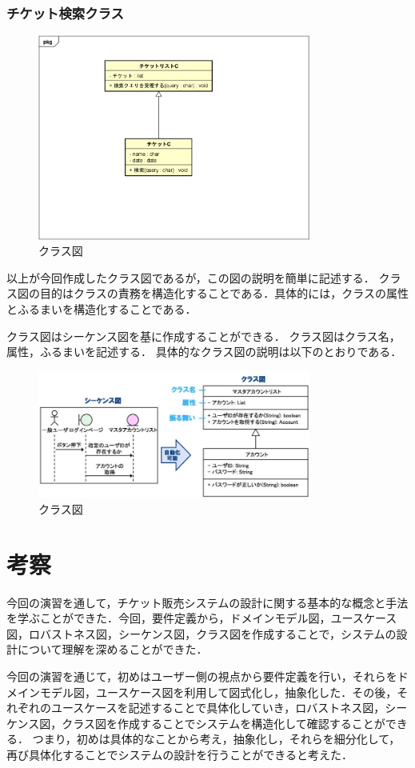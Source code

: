 \documentclass{ltjsarticle}
\begin{document}
\subsubsection{チケット検索クラス}
\begin{figure}[H]
    \centering
    \includegraphics[width=0.8\textwidth]{src/Class2.png}
    \caption{クラス図}
    \label{fig:class2}
\end{figure}

以上が今回作成したクラス図であるが，この図の説明を簡単に記述する．
クラス図の目的はクラスの責務を構造化することである．具体的には，クラスの属性とふるまいを構造化することである．

クラス図はシーケンス図を基に作成することができる．
クラス図はクラス名，属性，ふるまいを記述する．
具体的なクラス図の説明は以下のとおりである．
\begin{figure}[H]
    \centering
    \includegraphics[width=0.8\textwidth]{src/ExampleClass.png}
    \caption{クラス図}
    \label{fig:class2}
\end{figure}


\section{考察}
今回の演習を通して，チケット販売システムの設計に関する基本的な概念と手法を学ぶことができた．今回，要件定義から，ドメインモデル図，ユースケース図，ロバストネス図，シーケンス図，クラス図を作成することで，システムの設計について理解を深めることができた．

今回の演習を通じて，初めはユーザー側の視点から要件定義を行い，それらをドメインモデル図，ユースケース図を利用して図式化し，抽象化した．その後，それぞれのユースケースを記述することで具体化していき，ロバストネス図，シーケンス図，クラス図を作成することでシステムを構造化して確認することができる．
つまり，初めは具体的なことから考え，抽象化し，それらを細分化して，再び具体化することでシステムの設計を行うことができると考えた．
\end{document}
